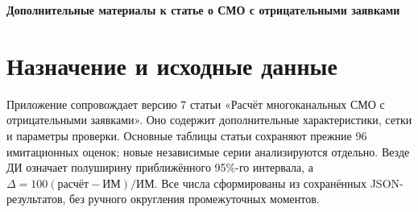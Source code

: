 \documentclass[a4paper,12pt]{article}
\begin{document}
\begin{center}\Large\bfseries Дополнительные материалы к статье о СМО с отрицательными заявками\end{center}
\section{Назначение и исходные данные}
Приложение сопровождает версию 7 статьи «Расчёт многоканальных СМО с отрицательными заявками». Оно содержит дополнительные характеристики, сетки и параметры проверки. Основные таблицы статьи сохраняют прежние 96 имитационных оценок; новые независимые серии анализируются отдельно. Везде ДИ означает полуширину приближённого 95\%-го интервала, а \(\Delta=100(\text{расчёт}-\text{ИМ})/\text{ИМ}\). Все числа сформированы из сохранённых JSON-результатов, без ручного округления промежуточных моментов.
\end{document}
